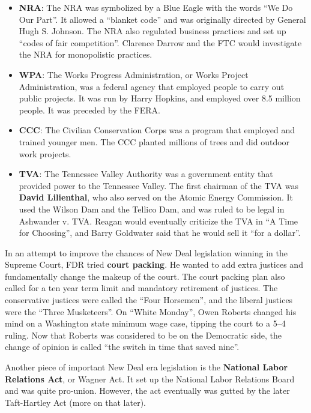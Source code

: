 \begin{itemize}
  \item
    \textbf{NRA}:
    The NRA was symbolized by a Blue Eagle with the words ``We Do Our Part''.
    It allowed a ``blanket code'' and was originally directed by General Hugh S. Johnson.
    The NRA also regulated business practices and set up ``codes of fair competition''.
    Clarence Darrow and the FTC would investigate the NRA for monopolistic practices.

  \item
    \textbf{WPA}:
    The Works Progress Administration, or Works Project Administration,
    was a federal agency that employed people to carry out public projects.
    It was run by Harry Hopkins, and employed over 8.5 million people.
    It was preceded by the FERA\@.

  \item
    \textbf{CCC}:
    The Civilian Conservation Corps was a program that employed and trained younger men.
    The CCC planted millions of trees and did outdoor work projects.

  \item
    \textbf{TVA}:
    The Tennessee Valley Authority was a government entity that provided power to the Tennessee Valley.
    The first chairman of the TVA was \textbf{David Lilienthal},
    who also served on the Atomic Energy Commission.
    It used the Wilson Dam and the Tellico Dam, and was ruled to be legal in Ashwander v. TVA\@.
    Reagan would eventually criticize the TVA in ``A Time for Choosing'',
    and Barry Goldwater said that he would sell it ``for a dollar''.
\end{itemize}

In an attempt to improve the chances of New Deal legislation winning in the Supreme Court,
FDR tried \textbf{court packing}.
He wanted to add extra justices and fundamentally change the makeup of the court.
The court packing plan also called for a ten year term limit and mandatory retirement of justices.
The conservative justices were called the ``Four Horsemen'',
and the liberal justices were the ``Three Musketeers''.
On ``White Monday'', Owen Roberts changed his mind on a Washington state minimum wage case,
tipping the court to a 5--4 ruling.
Now that Roberts was considered to be on the Democratic side,
the change of opinion is called ``the switch in time that saved nine''.

Another piece of important New Deal era legislation is the \textbf{National Labor Relations Act}, or Wagner Act.
It set up the National Labor Relations Board and was quite pro-union.
However, the act eventually was gutted by the later Taft-Hartley Act (more on that later).
